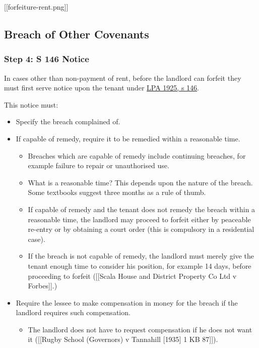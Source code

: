 \documentclass[
]{article}
\providecommand{\tightlist}{%
  \setlength{\itemsep}{0pt}\setlength{\parskip}{0pt}}
\begin{document}
{[}{[}forfeiture-rent.png{]}{]}

\hypertarget{breach-of-other-covenants}{%
\subsection{Breach of Other Covenants}\label{breach-of-other-covenants}}

\hypertarget{step-4-s-146-notice}{%
\subsubsection{Step 4: S 146 Notice}\label{step-4-s-146-notice}}

In cases other than non-payment of rent, before the landlord can forfeit
they must first serve notice upon the tenant under
\href{https://www.legislation.gov.uk/ukpga/Geo5/15-16/20/section/146}{LPA
1925, s 146}.

This notice must:

\begin{itemize}
\tightlist
\item
  Specify the breach complained of.
\item
  If capable of remedy, require it to be remedied within a reasonable
  time.

  \begin{itemize}
  \tightlist
  \item
    Breaches which are capable of remedy include continuing breaches,
    for example failure to repair or unauthorised use.
  \item
    What is a reasonable time? This depends upon the nature of the
    breach. Some textbooks suggest three months as a rule of thumb.
  \item
    If capable of remedy and the tenant does not remedy the breach
    within a reasonable time, the landlord may proceed to forfeit either
    by peaceable re-entry or by obtaining a court order (this is
    compulsory in a residential case).
  \item
    If the breach is not capable of remedy, the landlord must merely
    give the tenant enough time to consider his position, for example 14
    days, before proceeding to forfeit ({[}{[}Scala House and District
    Property Co Ltd v Forbes{]}{]}.)
  \end{itemize}
\item
  Require the lessee to make compensation in money for the breach if the
  landlord requires such compensation.

  \begin{itemize}
  \tightlist
  \item
    The landlord does not have to request compensation if he does not
    want it ({[}{[}Rugby School (Governors) v Tannahill {[}1935{]} 1 KB
    87{]}{]}).
  \end{itemize}
\end{itemize}
\end{document}
